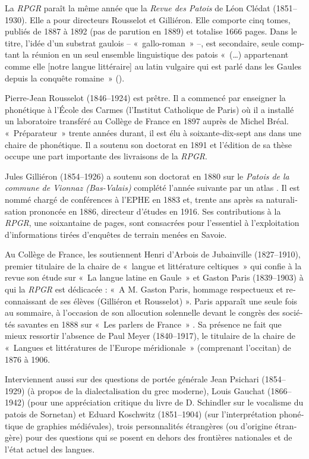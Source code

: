 \documentclass[french,output=paper,colorlinks,citecolor=brown]{../langscibook}
\begin{document}
\begin{otherlanguage}{french}
La \textit{RPGR} paraît la même année que la \textit{Revue des Patois} de Léon Clédat (1851--1930). Elle a pour directeurs Rousselot et Gilliéron. Elle comporte cinq tomes, publiés de 1887 à 1892 (pas de parution en 1889) et totalise 1666 pages. Dans le titre, l’idée d’un substrat gaulois – «~gallo-roman~» –, est secondaire, seule comptant la réunion en un seul ensemble linguistique des patois «~(…) appartenant comme elle [notre langue littéraire] au latin vulgaire qui est parlé dans les Gaules depuis la conquête romaine~» (\citealt[1]{Rousselot1887}). 

Pierre-Jean Rousselot (1846--1924) est prêtre. Il a commencé par enseigner la phonétique à l’École des Carmes (l’Institut Catholique de Paris) où il a installé un laboratoire transféré au Collège de France en 1897 auprès de Michel Bréal. «~Préparateur~» trente années durant, il est élu à soixante-dix-sept ans dans une chaire de phonétique. Il a soutenu son doctorat en 1891 et l’édition de sa thèse occupe une part importante des livraisons de la \textit{RPGR}. 

Jules Gilliéron (1854--1926) a soutenu son doctorat en 1880 sur le \textit{Patois de la commune de Vionnaz (Bas-Valais)} complété l’année suivante par un atlas \citep{Gilliéron1881}. Il est nommé chargé de conférences à l’EPHE en 1883 et, trente ans après sa naturalisation prononcée en 1886, directeur d’études en 1916. Ses contributions à la \textit{RPGR}, une soixantaine de pages, sont consacrées pour l’essentiel à l’exploitation d’informations tirées d’enquêtes de terrain menées en Savoie. 

Au Collège de France, les soutiennent Henri d’Arbois de Jubainville (1827--1910), premier titulaire de la chaire de «~langue et littérature celtiques~» qui confie à la revue son étude sur «~La langue latine en Gaule~» \citeyear[161--171]{Arbois-de-Jubainville1887} et Gaston Paris (1839--1903) à qui la \textit{RPGR} est dédicacée : «~A M. Gaston Paris, hommage respectueux et reconnaissant de ses élèves (Gilliéron et Rousselot) ». Paris apparaît une seule fois au sommaire, à l’occasion de son allocution solennelle devant le congrès des sociétés savantes en 1888 sur «~Les parlers de France~» \citeyear[161--175]{Paris1888}. Sa présence ne fait que mieux ressortir l’absence de Paul Meyer (1840--1917), le titulaire de la chaire de «~Langues et littératures de l’Europe méridionale~» (comprenant l’occitan) de 1876 à 1906.

Interviennent aussi sur des questions de portée générale Jean Psichari (1854--1929) (à propos de la dialectalisation du grec moderne), Louis Gauchat (1866--1942) (pour une appréciation critique du livre de D. Schindler sur le vocalisme du patois de Sornetan) et Eduard Koschwitz (1851--1904) (sur l’interprétation phonétique de graphies médiévales), trois personnalités étrangères (ou d’origine étrangère) pour des questions qui se posent en dehors des frontières nationales et de l’état actuel des langues.


\end{otherlanguage}
\end{document}
